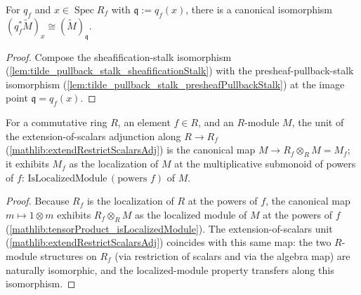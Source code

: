 \begin{lemma}
  \label{lem:tilde_pullback_stalk_pullbackStalkIso}
  \leanok
  For \(q_f\) and \(x\in\operatorname{Spec}R_f\) with \(\mathfrak q:=q_f(x)\), there is a
  canonical isomorphism \((q_f^{*}\widetilde M)_x\cong(\widetilde M)_{\mathfrak q}\).
\end{lemma}

\begin{proof}
  \leanok
  Compose the sheafification-stalk isomorphism
  (\cref{lem:tilde_pullback_stalk_sheafificationStalk}) with the presheaf-pullback-stalk
  isomorphism (\cref{lem:tilde_pullback_stalk_presheafPullbackStalk}) at the image point
  \(\mathfrak q=q_f(x)\).
\end{proof}


\begin{lemma}
  \label{found:extendScalars_unit_isLocalizedModule}
  For a commutative ring \(R\), an element \(f\in R\), and an \(R\)-module \(M\), the unit
  of the extension-of-scalars adjunction along \(R\to R_f\)
  (\cref{mathlib:extendRestrictScalarsAdj}) is the canonical map
  \(M\to R_f\otimes_R M=M_f\); it exhibits \(M_f\) as the localization of \(M\) at the
  multiplicative submonoid of powers of \(f\):
  \(\mathrm{IsLocalizedModule}\,(\text{powers }f)\) of \(M\).
\end{lemma}

\begin{proof}
  \leanok
  Because \(R_f\) is the localization of \(R\) at the powers of \(f\), the canonical map
  \(m\mapsto 1\otimes m\) exhibits \(R_f\otimes_R M\) as the localized module of \(M\) at the
  powers of \(f\) (\cref{mathlib:tensorProduct_isLocalizedModule}).  The extension-of-scalars unit (\cref{mathlib:extendRestrictScalarsAdj}) coincides with
  this same map: the two \(R\)-module structures on \(R_f\) (via restriction of scalars and
  via the algebra map) are naturally isomorphic, and the localized-module property transfers
  along this isomorphism.
\end{proof}

